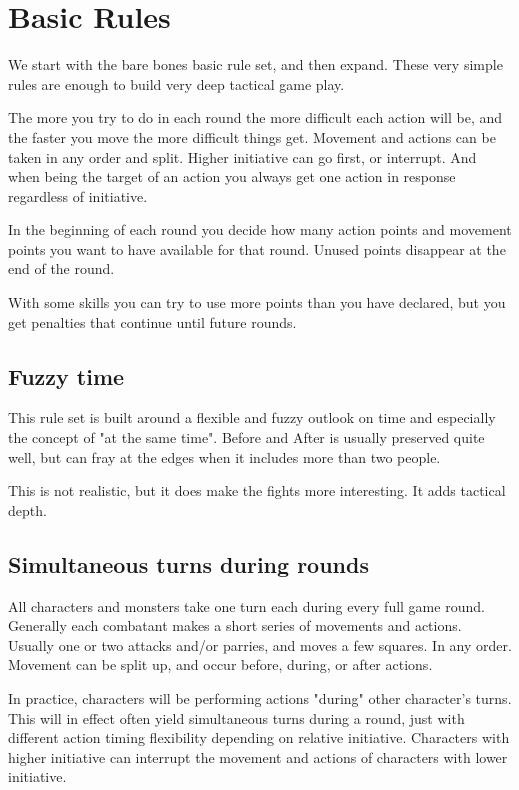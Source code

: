 
\section*{Basic Rules}
We start with the bare bones basic rule set, and then expand. These very simple rules are enough to build very deep tactical game play.

The more you try to do in each round the more difficult each action will be, and the faster you move the more difficult things get. Movement and actions can be taken in any order and split. Higher initiative can go first, or interrupt. And when being the target of an action you always get one action in response regardless of initiative.

In the beginning of each round you decide how many action points and movement points you want to have available for that round. Unused points disappear at the end of the round.

With some skills you can try to use more points than you have declared, but you get penalties that continue until future rounds.


\subsection*{Fuzzy time}
This rule set is built around a flexible and fuzzy outlook on time and especially the concept of "at the same time". Before and After is usually preserved quite well, but can fray at the edges when it includes more than two people.

This is not realistic, but it does make the fights more interesting. It adds tactical depth.


\subsection*{Simultaneous turns during rounds}
All characters and monsters take one turn each during every full game round. Generally each combatant makes a short series of movements and actions. Usually one or two attacks and/or parries, and moves a few squares. In any order. Movement can be split up, and occur before, during, or after actions.

In practice, characters will be performing actions "during" other character's turns. This will in effect often yield simultaneous turns during a round, just with different action timing flexibility depending on relative initiative. Characters with higher initiative can interrupt the movement and actions of characters with lower initiative.


